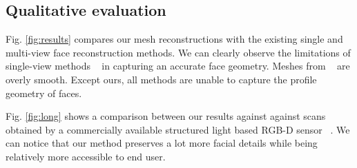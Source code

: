 \documentclass[10pt,twocolumn,letterpaper]{article}
\begin{document}





\subsection{Qualitative evaluation} \label{sec:qual}

Fig. \ref{fig:results} compares our mesh reconstructions with the existing single and multi-view face reconstruction methods. We can clearly observe the limitations of single-view methods ~\cite{sela2017unrestricted, feng2018joint} in capturing an accurate face geometry. Meshes from ~\cite{huber2016multiresolution} are overly smooth. Except ours, all methods are unable to capture the profile geometry of faces. 

Fig. \ref{fig:long} shows a comparison between our results against against scans obtained by a commercially available structured light based RGB-D sensor ~\cite{structure2019}. We can notice that our method preserves a lot more facial details while being relatively more accessible to end user.



\end{document}

